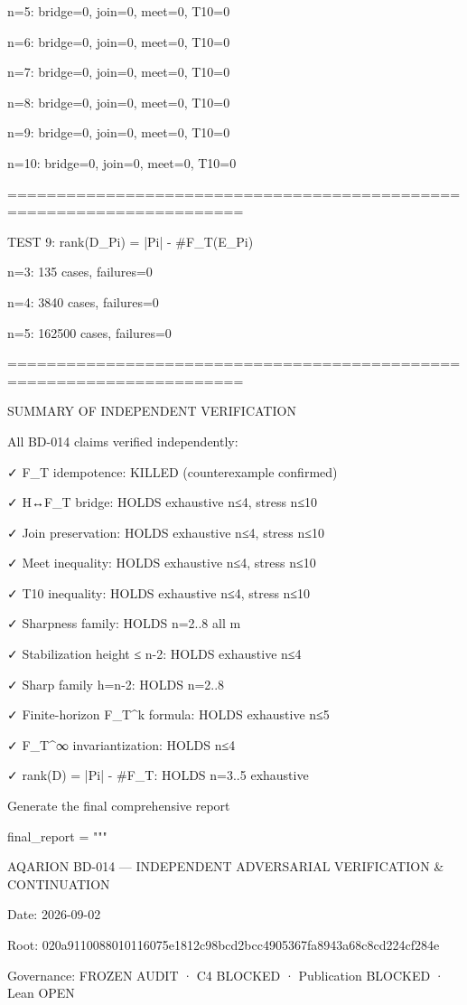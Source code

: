 n=5: bridge=0, join=0, meet=0, T10=0

n=6: bridge=0, join=0, meet=0, T10=0

n=7: bridge=0, join=0, meet=0, T10=0

n=8: bridge=0, join=0, meet=0, T10=0

n=9: bridge=0, join=0, meet=0, T10=0

n=10: bridge=0, join=0, meet=0, T10=0


======================================================================

TEST 9: rank(D_Pi) = |Pi| - #F_T(E_Pi)


n=3: 135 cases, failures=0

n=4: 3840 cases, failures=0

n=5: 162500 cases, failures=0


======================================================================

SUMMARY OF INDEPENDENT VERIFICATION


All BD-014 claims verified independently:

✓ F_T idempotence: KILLED (counterexample confirmed)

✓ H↔F_T bridge: HOLDS exhaustive n≤4, stress n≤10

✓ Join preservation: HOLDS exhaustive n≤4, stress n≤10

✓ Meet inequality: HOLDS exhaustive n≤4, stress n≤10

✓ T10 inequality: HOLDS exhaustive n≤4, stress n≤10

✓ Sharpness family: HOLDS n=2..8 all m

✓ Stabilization height ≤ n-2: HOLDS exhaustive n≤4

✓ Sharp family h=n-2: HOLDS n=2..8

✓ Finite-horizon F_T^k formula: HOLDS exhaustive n≤5

✓ F_T^∞ invariantization: HOLDS n≤4

✓ rank(D) = |Pi| - #F_T: HOLDS n=3..5 exhaustive


Generate the final comprehensive report


final_report = """


AQARION BD-014 — INDEPENDENT ADVERSARIAL VERIFICATION & CONTINUATION

Date: 2026-09-02

Root: 020a9110088010116075e1812c98bcd2bcc4905367fa8943a68c8cd224cf284e

Governance: FROZEN AUDIT · C4 BLOCKED · Publication BLOCKED · Lean OPEN


